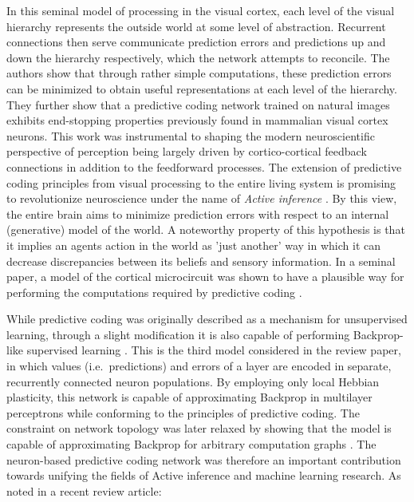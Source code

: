 In this seminal model of processing in the visual cortex, each level of the visual hierarchy represents the outside
world at some level of abstraction. Recurrent connections then serve communicate prediction errors and predictions up
and down the hierarchy respectively, which the network attempts to reconcile. The authors show that through rather
simple computations, these prediction errors can be minimized to obtain useful representations at each level of the
hierarchy. They further show that a predictive coding network trained on natural images exhibits end-stopping properties
previously found in mammalian visual cortex neurons. This work was instrumental to shaping the modern neuroscientific
perspective of perception being largely driven by cortico-cortical feedback connections in addition to the feedforward
processes. The extension of predictive coding principles from visual processing to the entire living system is promising
to revolutionize neuroscience under the name of \textit{Active inference} \citep{Friston2008,Friston2009,Adams2015}. By
this view, the entire brain aims to minimize prediction errors with respect to an internal (generative) model of the
world. A noteworthy property of this hypothesis is that it implies an agents action in the world as 'just another' way
in which it can decrease discrepancies between its beliefs and sensory information. In a seminal paper, a model of the
cortical microcircuit \citep{haeusler2007statistical} was shown to have a plausible way for performing the computations
required by predictive coding \citep{bastos2012canonical}.

While predictive coding was originally described as a mechanism for unsupervised learning, through a slight modification
it is also capable of performing Backprop-like supervised learning \citep{Whittington2017}. This is the third model
considered in the review paper, in which values (i.e.\ predictions) and errors of a layer are encoded in separate,
recurrently connected neuron populations. By employing only local Hebbian plasticity, this network is capable of
approximating Backprop in multilayer perceptrons while conforming to the principles of predictive coding. The constraint
on network topology was later relaxed by showing that the model is capable of approximating Backprop for arbitrary
computation graphs \citep{Millidge2022}. The neuron-based predictive coding network was therefore an important
contribution towards unifying the fields of Active inference and machine learning research. As noted in a recent review
article:

